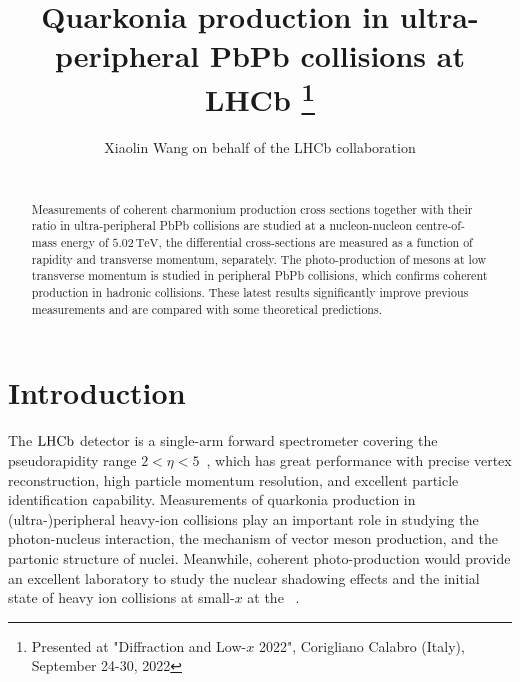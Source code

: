 \documentclass{appolb}
\begin{document}
\title{Quarkonia production in ultra-peripheral PbPb collisions at LHCb%
\thanks{Presented at "Diffraction and Low-$x$ 2022", Corigliano Calabro (Italy), September 24-30, 2022}%
}
\author{Xiaolin Wang on behalf of the LHCb collaboration 
\address{Guangdong Provincial Key Laboratory of Nuclear Science, Guangdong-Hong Kong Joint Laboratory of Quantum Matter, Institute of Quantum Matter, South China Normal University, Guangzhou, China}
\\[3mm]
}
\maketitle
\begin{abstract}
Measurements of coherent charmonium production cross sections together with their ratio in ultra-peripheral PbPb collisions are studied at a nucleon-nucleon centre-of-mass energy of $5.02\,\mathrm{TeV}$,
the differential cross-sections are measured as a function of rapidity and transverse momentum, separately.
The photo-production of \jpsi mesons at low transverse momentum is studied in peripheral PbPb collisions, which confirms coherent \jpsi production in hadronic collisions.
These latest results significantly improve previous measurements and are compared with some theoretical predictions.
\end{abstract}
  
\section{Introduction}
The $\mbox{LHCb}$ detector is a single-arm forward spectrometer covering the \mbox{pseudorapidity} range $2<\eta <5$~\cite{LHCb-DP-2008-001, LHCb-DP-2014-002}, 
which has great performance with precise vertex reconstruction, high particle momentum resolution, and excellent particle identification capability. 
Measurements of quarkonia production in (ultra-)peripheral heavy-ion collisions play an important role in studying the photon-nucleus interaction, the mechanism of vector meson production, and the partonic structure of nuclei. Meanwhile, coherent photo-production would provide an excellent laboratory to study the nuclear shadowing effects and the initial state of heavy ion collisions at small-$x$ at the \lhc~\cite{Jones:2015nna}. 
\end{document}
